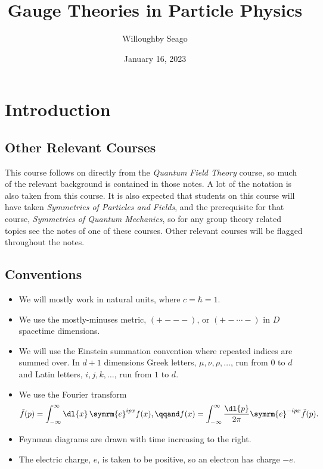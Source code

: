 \documentclass[fleqn]{NotesClass}
\title{Gauge Theories in Particle Physics}
\author{Willoughby Seago}
\date{January 16, 2023}
\newcommand*{\course}[1]{\textit{#1}}
\newcommand{\e}{\symrm{e}}
\begin{document}
    \frontmatter
    \titlepage
    \innertitlepage{}
    \tableofcontents
    \listoffigures
    \mainmatter
    
    \chapter{Introduction}
    \section{Other Relevant Courses}
    This course follows on directly from the \course{Quantum Field Theory} course, so much of the relevant background is contained in those notes.
    A lot of the notation is also taken from this course.
    It is also expected that students on this course will have taken \course{Symmetries of Particles and Fields}, and the prerequisite for that course, \course{Symmetries of Quantum Mechanics}, so for any group theory related topics see the notes of one of these courses.
    Other relevant courses will be flagged throughout the notes.
    
    \section{Conventions}
    \begin{itemize}
        \item We will mostly work in natural units, where \(c = \hbar = 1\).
        \item We use the mostly-minuses metric, \(({+}{-}{-}{-})\), or \(({+}{-}\dotsb{-})\) in \(D\) spacetime dimensions.
        \item We will use the Einstein summation convention where repeated indices are summed over.
        In \(d + 1\) dimensions Greek letters, \(\mu, \nu, \rho, \dotsc\), run from 0 to \(d\) and Latin letters, \(i, j, k, \dotsc\), run from \(1\) to \(d\).
        \item We use the Fourier transform
        \begin{equation}
            \tilde{f}(p) = \int_{-\infty}^{\infty} \dl{x} \, \e^{ipx}f(x), \qqand f(x) = \int_{-\infty}^{\infty} \frac{\dl{p}}{2\pi} \e^{-ipx}\tilde{f}(p).
        \end{equation}
        \item Feynman diagrams are drawn with time increasing to the right.
        \item The electric charge, \(e\), is taken to be positive, so an electron has charge \(-e\).
    \end{itemize}
    
\end{document}
